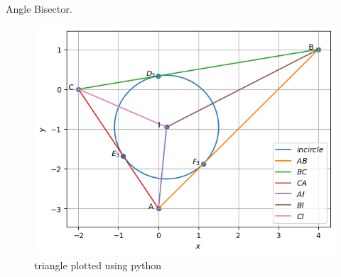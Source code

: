 \begin{table}[H]
        \centering
        
        \caption{Angle Bisector.}
        \label{tab:angle-bisector}
    \end{table}
\begin{figure}[H]
	\includegraphics[width=\columnwidth]{ang_bisec/figs/Incentre.png}
\caption{triangle plotted using python}
\label{fig:i_Incentre_py}
\end{figure}

